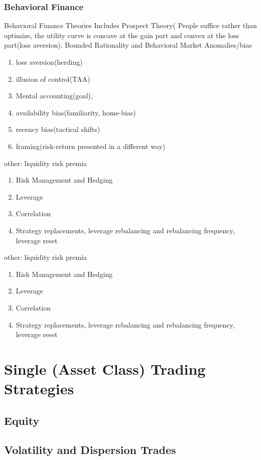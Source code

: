 \documentclass[11pt, openany]{book}              %
\begin{document}
\subsection{Behavioral Finance}

Behavioral Finance Theories Includes Prospect Theory( People suffice rather than optimize, the utility curve is concave at the gain part and convex at the loss part(loss aversion). Bounded Rationality and 
Behavioral Market Anomalies/bias

\begin{enumerate}
 \item loss aversion(herding)
 \item illusion of control(TAA) 
 \item Mental accounting(goal),
 \item availability bias(familiarity, home-bias)
 \item recency bias(tactical shifts)
 \item framing(risk-return presented in a different way)
\end{enumerate}




other: liquidity risk premia
\begin{enumerate}
 \item Risk Management and Hedging 
 \item Leverage 
 \item Correlation
 \item Strategy replacements, leverage rebalancing and rebalancing frequency, leverage reset
\end{enumerate}


other: liquidity risk premia
\begin{enumerate}
 \item Risk Management and Hedging 
 \item Leverage 
 \item Correlation
 \item Strategy replacements, leverage rebalancing and rebalancing frequency, leverage reset
\end{enumerate}


\chapter{Single (Asset Class) Trading Strategies}
\section{Equity}
\section{Volatility and Dispersion Trades}
\end{document}
